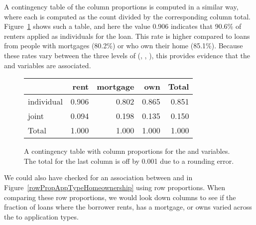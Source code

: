 A contingency table of the column proportions is computed in a similar way, where each  is computed as the count divided by the corresponding column total. Figure~\ref{colPropAppTypeHomeownership} shows such a table, and here the value 0.906 indicates that 90.6\% of renters applied as individuals for the loan. This rate is higher compared to loans from people with mortgages (80.2\%) or who own their home (85.1\%). Because these rates vary between the three levels of  (, , ), this provides evidence that the  and  variables are associated.

\begin{figure}[h]
\centering%
\begin{tabular}{l rrr r}
  \hline
  & rent & mortgage & own & Total \\
  \hline
  individual &
      0.906 &
      0.802 &
      0.865 &
      0.851 \\
  joint &
      0.094 &
      0.198 &
      0.135 &
      0.150 \\
  \hline
  Total & 1.000 & 1.000 & 1.000 & 1.000 \\
  \hline
\end{tabular}
\caption{A contingency table with column proportions for the
     and 
    variables.
    The total for the last column is off by 0.001 due
    to a rounding error.}
\label{colPropAppTypeHomeownership}
\end{figure}

We could also have checked for an association between  and  in Figure~\ref{rowPropAppTypeHomeownership} using row proportions. When comparing these row proportions, we would look down columns to see if the fraction of loans where the borrower rents, has a mortgage, or owns varied across the  to  application types.

